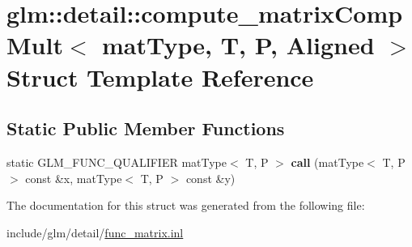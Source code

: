 \hypertarget{structglm_1_1detail_1_1compute__matrixCompMult}{}\section{glm\+:\+:detail\+:\+:compute\+\_\+matrix\+Comp\+Mult$<$ mat\+Type, T, P, Aligned $>$ Struct Template Reference}
\label{structglm_1_1detail_1_1compute__matrixCompMult}
\subsection*{Static Public Member Functions}
\begin{DoxyCompactItemize}
\item 
\mbox{\label{structglm_1_1detail_1_1compute__matrixCompMult_aa64b646145925b6436effcd85c9a5556}} 
static G\+L\+M\+\_\+\+F\+U\+N\+C\+\_\+\+Q\+U\+A\+L\+I\+F\+I\+ER mat\+Type$<$ T, P $>$ {\bfseries call} (mat\+Type$<$ T, P $>$ const \&x, mat\+Type$<$ T, P $>$ const \&y)
\end{DoxyCompactItemize}


The documentation for this struct was generated from the following file\+:\begin{DoxyCompactItemize}
\item 
include/glm/detail/\hyperlink{func__matrix_8inl}{func\+\_\+matrix.\+inl}\end{DoxyCompactItemize}
